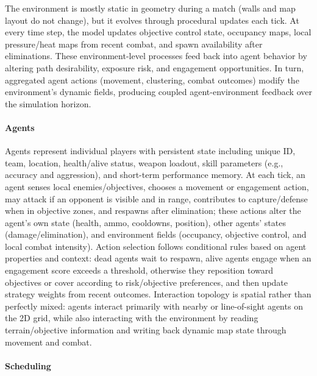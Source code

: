 \documentclass{assignment}
\begin{document}
The environment is mostly static in geometry during a match (walls and map layout do not change), but it evolves through procedural updates each tick. At every time step, the model updates objective control state, occupancy maps, local pressure/heat maps from recent combat, and spawn availability after eliminations. These environment-level processes feed back into agent behavior by altering path desirability, exposure risk, and engagement opportunities. In turn, aggregated agent actions (movement, clustering, combat outcomes) modify the environment's dynamic fields, producing coupled agent-environment feedback over the simulation horizon.

\paragraph{Agents}
Agents represent individual players with persistent state including unique ID, team, location, health/alive status, weapon loadout, skill parameters (e.g., accuracy and aggression), and short-term performance memory. At each tick, an agent senses local enemies/objectives, chooses a movement or engagement action, may attack if an opponent is visible and in range, contributes to capture/defense when in objective zones, and respawns after elimination; these actions alter the agent's own state (health, ammo, cooldowns, position), other agents' states (damage/elimination), and environment fields (occupancy, objective control, and local combat intensity). Action selection follows conditional rules based on agent properties and context: dead agents wait to respawn, alive agents engage when an engagement score exceeds a threshold, otherwise they reposition toward objectives or cover according to risk/objective preferences, and then update strategy weights from recent outcomes. Interaction topology is spatial rather than perfectly mixed: agents interact primarily with nearby or line-of-sight agents on the 2D grid, while also interacting with the environment by reading terrain/objective information and writing back dynamic map state through movement and combat.

\paragraph{Scheduling}
\end{document}
